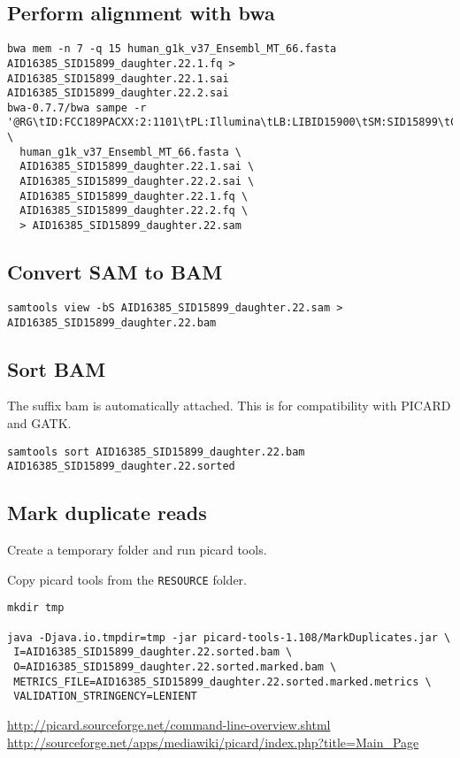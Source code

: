 \documentclass{article}
\begin{document}
\subsection{Perform alignment with bwa} 

\begin{verbatim}
bwa mem -n 7 -q 15 human_g1k_v37_Ensembl_MT_66.fasta AID16385_SID15899_daughter.22.1.fq > AID16385_SID15899_daughter.22.1.sai AID16385_SID15899_daughter.22.2.sai 
bwa-0.7.7/bwa sampe -r '@RG\tID:FCC189PACXX:2:1101\tPL:Illumina\tLB:LIBID15900\tSM:SID15899\tCN:CCG' \
  human_g1k_v37_Ensembl_MT_66.fasta \
  AID16385_SID15899_daughter.22.1.sai \
  AID16385_SID15899_daughter.22.2.sai \
  AID16385_SID15899_daughter.22.1.fq \
  AID16385_SID15899_daughter.22.2.fq \
  > AID16385_SID15899_daughter.22.sam
\end{verbatim}


\subsection{Convert SAM to BAM}
\begin{verbatim}
samtools view -bS AID16385_SID15899_daughter.22.sam > AID16385_SID15899_daughter.22.bam
\end{verbatim}
\subsection{Sort BAM}
The suffix bam is automatically attached. This is for compatibility with PICARD and GATK.

\begin{verbatim}
samtools sort AID16385_SID15899_daughter.22.bam  AID16385_SID15899_daughter.22.sorted 
\end{verbatim}

\subsection{Mark duplicate reads}

Create a temporary folder and run picard tools.

Copy picard tools from the \verb+RESOURCE+ folder.
\begin{verbatim}
mkdir tmp

java -Djava.io.tmpdir=tmp -jar picard-tools-1.108/MarkDuplicates.jar \
 I=AID16385_SID15899_daughter.22.sorted.bam \
 O=AID16385_SID15899_daughter.22.sorted.marked.bam \
 METRICS_FILE=AID16385_SID15899_daughter.22.sorted.marked.metrics \
 VALIDATION_STRINGENCY=LENIENT

\end{verbatim}        
\url{http://picard.sourceforge.net/command-line-overview.shtml}
\url{http://sourceforge.net/apps/mediawiki/picard/index.php?title=Main_Page}
\end{document}
